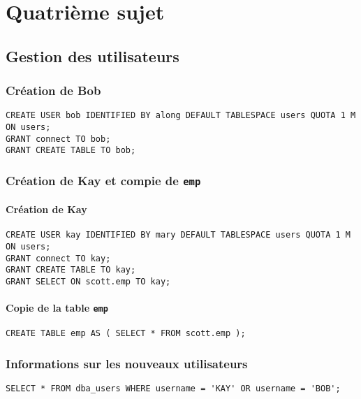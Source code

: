 \section{Quatrième sujet}
\subsection{Gestion des utilisateurs}

\subsubsection{Création de Bob}

\begin{verbatim}
CREATE USER bob IDENTIFIED BY along DEFAULT TABLESPACE users QUOTA 1 M ON users;
GRANT connect TO bob;
GRANT CREATE TABLE TO bob;

\end{verbatim}

\subsubsection{Création de Kay et compie de \texttt{emp}}

\paragraph{Création de Kay}
\begin{verbatim}
CREATE USER kay IDENTIFIED BY mary DEFAULT TABLESPACE users QUOTA 1 M ON users;
GRANT connect TO kay;
GRANT CREATE TABLE TO kay;
GRANT SELECT ON scott.emp TO kay;
\end{verbatim}

\paragraph{Copie de la table \texttt{emp}}

\begin{verbatim}
CREATE TABLE emp AS ( SELECT * FROM scott.emp );
\end{verbatim}

\subsubsection{Informations sur les nouveaux utilisateurs} 

\begin{verbatim}
SELECT * FROM dba_users WHERE username = 'KAY' OR username = 'BOB';
\end{verbatim}

